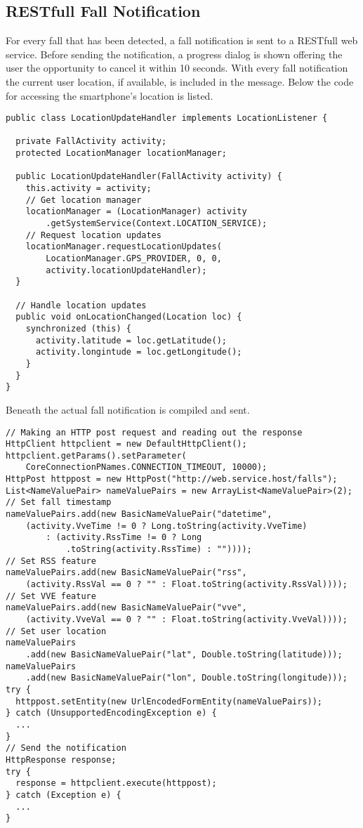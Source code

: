 \documentclass[a4paper, 10pt]{article}
\begin{document}
\subsection{RESTfull Fall Notification}
For every fall that has been detected, a fall notification is sent to a RESTfull web service. Before sending the notification, a progress dialog is shown offering the user the opportunity to cancel it within 10 seconds. With every fall notification the current user location, if available, is included in the message. Below the code for accessing the smartphone's location is listed.
\begin{lstlisting}
public class LocationUpdateHandler implements LocationListener {

  private FallActivity activity;
  protected LocationManager locationManager;

  public LocationUpdateHandler(FallActivity activity) {
    this.activity = activity;
    // Get location manager
    locationManager = (LocationManager) activity
        .getSystemService(Context.LOCATION_SERVICE);
    // Request location updates
    locationManager.requestLocationUpdates(
        LocationManager.GPS_PROVIDER, 0, 0,
        activity.locationUpdateHandler);
  }

  // Handle location updates
  public void onLocationChanged(Location loc) {
    synchronized (this) {
      activity.latitude = loc.getLatitude();
      activity.longintude = loc.getLongitude();
    }
  }
}
\end{lstlisting}
Beneath the actual fall notification is compiled and sent.
\begin{lstlisting}
// Making an HTTP post request and reading out the response
HttpClient httpclient = new DefaultHttpClient();
httpclient.getParams().setParameter(
    CoreConnectionPNames.CONNECTION_TIMEOUT, 10000);
HttpPost httppost = new HttpPost("http://web.service.host/falls");
List<NameValuePair> nameValuePairs = new ArrayList<NameValuePair>(2);
// Set fall timestamp
nameValuePairs.add(new BasicNameValuePair("datetime",
    (activity.VveTime != 0 ? Long.toString(activity.VveTime)
        : (activity.RssTime != 0 ? Long
            .toString(activity.RssTime) : ""))));
// Set RSS feature
nameValuePairs.add(new BasicNameValuePair("rss",
    (activity.RssVal == 0 ? "" : Float.toString(activity.RssVal))));
// Set VVE feature
nameValuePairs.add(new BasicNameValuePair("vve",
    (activity.VveVal == 0 ? "" : Float.toString(activity.VveVal))));
// Set user location
nameValuePairs
    .add(new BasicNameValuePair("lat", Double.toString(latitude)));
nameValuePairs
    .add(new BasicNameValuePair("lon", Double.toString(longitude)));
try {
  httppost.setEntity(new UrlEncodedFormEntity(nameValuePairs));
} catch (UnsupportedEncodingException e) {
  ...
}
// Send the notification
HttpResponse response;
try {
  response = httpclient.execute(httppost);
} catch (Exception e) {
  ...
}
\end{lstlisting}
\end{document}
